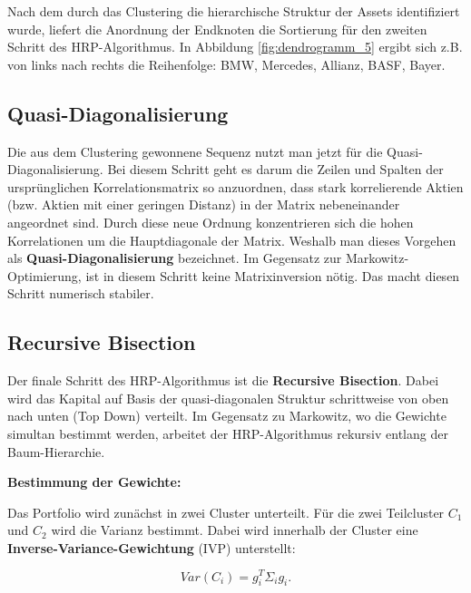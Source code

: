 \documentclass[parskip=half]{scrartcl}
\begin{document}
	Nach dem durch das Clustering die hierarchische Struktur der Assets identifiziert wurde, liefert die Anordnung der Endknoten die Sortierung für den zweiten Schritt des HRP-Algorithmus. In Abbildung \ref{fig:dendrogramm_5} ergibt sich z.B. von links nach rechts die Reihenfolge: BMW, Mercedes, Allianz, BASF, Bayer. 
	
	\subsection{Quasi-Diagonalisierung}
	
	Die aus dem Clustering gewonnene Sequenz nutzt man jetzt für die Quasi-Diagonalisierung. Bei diesem Schritt geht es darum die Zeilen und Spalten der ursprünglichen Korrelationsmatrix so anzuordnen, dass stark korrelierende Aktien (bzw. Aktien mit einer geringen Distanz) in der Matrix nebeneinander angeordnet sind. Durch diese neue Ordnung konzentrieren sich die hohen Korrelationen um die Hauptdiagonale der Matrix. Weshalb man dieses Vorgehen als \textbf{Quasi-Diagonalisierung} bezeichnet. Im Gegensatz zur Markowitz-Optimierung, ist in diesem Schritt keine Matrixinversion nötig. Das macht diesen Schritt numerisch stabiler.
	
	\subsection{Recursive Bisection}
	
	Der finale Schritt des HRP-Algorithmus ist die \textbf{Recursive Bisection}. Dabei wird das Kapital auf Basis der quasi-diagonalen Struktur schrittweise von oben nach unten (Top Down) verteilt. Im Gegensatz zu Markowitz, wo die Gewichte simultan bestimmt werden, arbeitet der HRP-Algorithmus rekursiv entlang der Baum-Hierarchie.
	
	\textbf{Bestimmung der Gewichte: }
	
	Das Portfolio wird zunächst in zwei Cluster unterteilt. Für die zwei Teilcluster $C_1$ und $C_2$ wird die Varianz bestimmt. Dabei wird innerhalb der Cluster eine \textbf{Inverse-Variance-Gewichtung} (IVP) unterstellt:
	
	\begin{equation}
		Var(C_i) = g_i^T \Sigma_i g_i . \label{eq:ivp}
	\end{equation}
	
\end{document}
